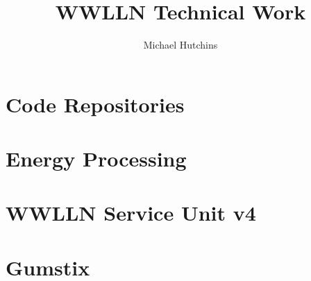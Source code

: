 \documentclass[12pt, letterpaper, onecolumn, oneside]{report}
\title{WWLLN Technical Work}
\author{Michael Hutchins}
\begin{document}
\maketitle

%
%

\tableofcontents
\listoffigures
\listoftables  %

%
%


\chapter{Code Repositories}
\label{thesis:appendix:code}




\chapter{Energy Processing}
\label{thesis:appendix:energy}




\chapter{WWLLN Service Unit v4}
\label{thesis:appendix:su}




\chapter{Gumstix}
\label{thesis:appendix:gumstix}





% 

%
%



\end{document}
